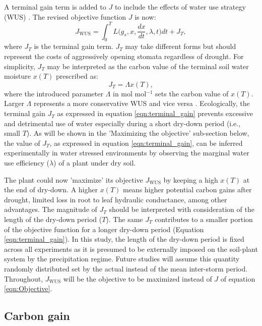 \documentclass[utf8]{frontiersSCNS} %
\begin{document}
A terminal gain term is added to $J$ to include the effects of water use strategy (WUS) \citep{manzoni_optimization_2013}. The revised objective function $J$ is now:
\begin{equation}
    \label{eqn:Objective_WUS}
    J_{\text{WUS}} = \int_0^{T} L\Big(g_s, x, \frac{dx}{dt},\lambda,t \Big) dt + J_{T},
\end{equation}
where $J_T$ is the terminal gain term. $J_T$ may take different forms but should represent the costs of aggressively opening stomata regardless of drought. For simplicity, $J_T$ may be interpreted as the carbon value of the terminal soil water moisture $x(T)$ prescribed as:
\begin{equation}
    \label{eqn:terminal_gain}
    J_{T} = \Lambda x(T),
\end{equation}
where the introduced parameter $\Lambda$ in mol mol$^{-1}$ sets the carbon value of $x(T)$. Larger $\Lambda$ represents a more conservative WUS and vice versa \citep{manzoni_optimization_2013}. Ecologically, the terminal gain $J_{T}$ as expressed in equation \ref{eqn:terminal_gain} prevents excessive and detrimental use of water especially during a short dry-down period (i.e., small $T$). As will be shown in the 'Maximizing the objective' sub-section below, the value of $J_T$, as expressed in equation \ref{eqn:terminal_gain}, can be inferred experimentally in water stressed environments by observing the marginal water use efficiency ($\lambda$) of a plant under dry soil. 

The plant could now 'maximize' its objective $J_{\text{WUS}}$ by keeping a high $x(T)$ at the end of dry-down. A higher $x(T)$ means higher potential carbon gains after drought, limited loss in root to leaf hydraulic conductance, among other advantages.  The magnitude of $J_{T}$ should be interpreted with consideration of the length of the dry-down period ($T$). The same $J_{T}$ contributes to a smaller portion of the objective function for a longer dry-down period (Equation \ref{eqn:terminal_gain}). In this study, the length of the dry-down period is fixed across all experiments as it is presumed to be externally imposed on the soil-plant system by the precipitation regime. Future studies will assume this quantity randomly distributed set by the actual instead of the mean inter-storm period.  Throughout, $J_{\text{WUS}}$ will be the objective to be maximized instead of $J$ of equation \ref{eqn:Objective}.

\subsection{Carbon gain}
\end{document}

